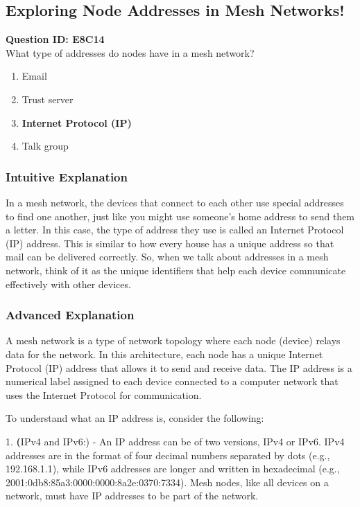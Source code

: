 \subsection{Exploring Node Addresses in Mesh Networks!}

\begin{tcolorbox}
\textbf{Question ID: E8C14} \\
What type of addresses do nodes have in a mesh network? 
\begin{enumerate}[label=\Alph*.]
    \item Email
    \item Trust server
    \item \textbf{Internet Protocol (IP)}
    \item Talk group
\end{enumerate}
\end{tcolorbox}

\subsubsection{Intuitive Explanation}
In a mesh network, the devices that connect to each other use special addresses to find one another, just like you might use someone's home address to send them a letter. In this case, the type of address they use is called an Internet Protocol (IP) address. This is similar to how every house has a unique address so that mail can be delivered correctly. So, when we talk about addresses in a mesh network, think of it as the unique identifiers that help each device communicate effectively with other devices.

\subsubsection{Advanced Explanation}
A mesh network is a type of network topology where each node (device) relays data for the network. In this architecture, each node has a unique Internet Protocol (IP) address that allows it to send and receive data. The IP address is a numerical label assigned to each device connected to a computer network that uses the Internet Protocol for communication.

To understand what an IP address is, consider the following:

1. \textbf(IPv4 and IPv6:) 
   - An IP address can be of two versions, IPv4 or IPv6. IPv4 addresses are in the format of four decimal numbers separated by dots (e.g., 192.168.1.1), while IPv6 addresses are longer and written in hexadecimal (e.g., 2001:0db8:85a3:0000:0000:8a2e:0370:7334). Mesh nodes, like all devices on a network, must have IP addresses to be part of the network.

